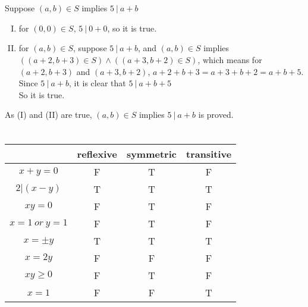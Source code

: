 \documentclass{article}
\begin{document}
\section{}
Suppose $(a,b)\in S$ implies $5\ |\ a+b$
\begin{enumerate}[(I)]
\item
for $(0,0)\in S$, $5\ |\ 0+0$, so it is true.
\item
for $(a,b)\in S$, suppose $5\ |\ a+b$, and $(a,b)\in S$ implies $((a+2,b+3)\in S)\land((a+3,b+2)\in S)$, which means for $(a+2,b+3)$ and $(a+3,b+2)$, $a+2+b+3=a+3+b+2=a+b+5$. Since $5\ |\ a+b$, it is clear that $5\ |\ a+b+5$\\
So it is true.
\end{enumerate}
As (I) and (II) are true, $(a,b)\in S$ implies $5\ |\ a+b$ is proved.

\section{}

\begin{table}[!h]
\centering
\begin{center}
\begin{tabular}{cccc}
\hline
 & reflexive & symmetric & transitive\\
\hline
$x+y=0$			& F & T & F \\
$2|(x-y)$		& T & T & T \\
$xy=0$			& F & T & F \\
$x=1\ or\ y=1$ 	& F & T & F \\
$x=\pm y$		& T & T & T \\
$x=2y$			& F & F & F \\
$xy\geqslant0$	& F & T & F \\
$x=1$			& F & F & T \\
\hline
\end{tabular}
\end{center}
\end{table}
\end{document}
